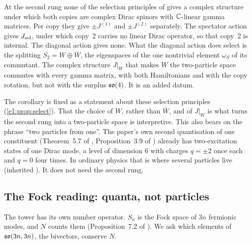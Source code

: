 \begin{corollary}
\label{e1:cor:nocx}
At the second rung none of the selection principles of \cite{ES17} gives a complex structure under which both copies are complex Dirac spinors
with $\mathbb{C}$-linear gamma matrices. Per copy they give $\pm J^{(1)}$ and $\pm J^{(2)}$ separately. The spectator action gives
$J_{\rm sel}$, under which copy~2 carries no linear Dirac operator, so that copy~2 is internal. The diagonal action gives none. What the
diagonal action does select is the splitting $S_2=W\oplus\overline W$, the eigenspaces of the one nontrivial element $\omega_S$ of its commutant.
The complex structure $J|_W$ that makes $W$ the two-particle space commutes with every gamma matrix, with both Hamiltonians and with the copy
rotation, but not with the surplus $\mathfrak{so}(4)$. It is an added datum.
\end{corollary}

The corollary is fixed as a statement about these selection principles (\cref{e1:prop:select}). That the choice of $W$, rather than
$\overline W$, and of $J|_W$ is what turns the second rung into a two-particle space is interpretive. This also bears on the phrase
``two particles from one''. The paper's own second quantisation of one constituent (Theorem~5.7 of \cite{ES17}, Proposition~3.9 of
\cite{RE}) already has two-excitation states of one Dirac mode, a level of dimension $6$ with charges $q=\pm2$ once each and $q=0$ four times.
In ordinary physics that is where several particles live (inherited \cite{Fock32}). It does not need the second rung.

\subsection{The Fock reading: quanta, not particles}
\label{e1:sec:fock}

The tower has its own number operator. $S_n$ is the Fock space of $3n$ fermionic modes, and $N$ counts them (Proposition~7.2 of
\cite{RE}). We ask which elements of $\mathfrak{so}(3n,3n)$, the bivectors, conserve $N$.

